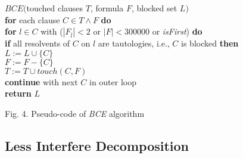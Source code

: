 \documentclass{llncs}
\begin{document}
\begin{flushleft}
\begin{sf}
\begin{footnotesize}

\hskip 12mm $BCE($touched clauses $T$, formula $F$, blocked set $L)$\\
\hskip 16mm {\bf for } each clause $ C \in T \wedge F$ {\bf do}\\
\hskip 20mm    {\bf for }  $ l \in C $ with ($|F_{\bar l}|<2$ or $|F|<300000$ or \emph{isFirst}) {\bf do}\\
\hskip 24mm    {\bf if } all resolvents of $C$ on $l$ are tautologies, i.e., $C$ is blocked {\bf then}\\
\hskip 28mm $L := L \cup \{C\}$\\
\hskip 28mm $F := F - \{C\}$\\
\hskip 28mm $T := T \cup touch(C, F)$\\
\hskip 28mm {\bf continue} with next $C$ in outer loop\\
\hskip 16mm {\bf return} $L$

\vspace{1em}
\hskip 8mm \textrm{Fig. 4. Pseudo-code of \emph{BCE}
algorithm}
\end{footnotesize}
\end{sf}
\end{flushleft}


\subsection{Less Interfere Decomposition}
\end{document}
